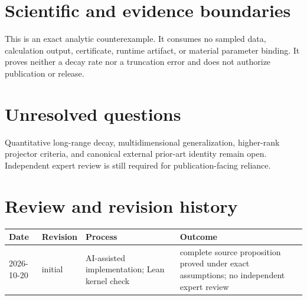 \documentclass[11pt]{article}
\begin{document}
\section{Scientific and evidence boundaries}
This is an exact analytic counterexample. It consumes no sampled data, calculation output,
certificate, runtime artifact, or material parameter binding. It proves neither a decay
rate nor a truncation error and does not authorize publication or release.

\section{Unresolved questions}
Quantitative long-range decay, multidimensional generalization, higher-rank projector
criteria, and canonical external prior-art identity remain open. Independent expert
review is still required for publication-facing reliance.

\section{Review and revision history}
\begin{tabularx}{\textwidth}{@{}lllX@{}}\toprule
Date & Revision & Process & Outcome \\
\midrule
2026-10-20 & initial & AI-assisted implementation; Lean kernel check & complete source proposition proved under exact assumptions; no independent expert review \\
\bottomrule\end{tabularx}
\end{document}
